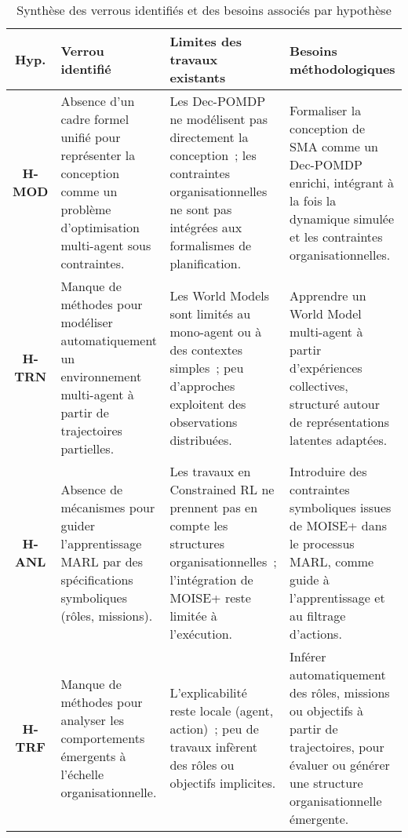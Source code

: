 \begin{table}[ht]
  \centering
  \caption{Synthèse des verrous identifiés et des besoins associés par hypothèse}
  \label{tab:verrous_hypotheses}
  \renewcommand{\arraystretch}{1.3}
  \begin{tabularx}{\textwidth}{cXXX}
    \hline
    \textbf{Hyp.}  & \textbf{Verrou identifié}                                                                                                      & \textbf{Limites des travaux existants}                                                                                                                 & \textbf{Besoins méthodologiques}                                                                                                                      \\
    \hline
    \textbf{H-MOD} & Absence d'un cadre formel unifié pour représenter la conception comme un problème d'optimisation multi-agent sous contraintes. & Les Dec-POMDP ne modélisent pas directement la conception~; les contraintes organisationnelles ne sont pas intégrées aux formalismes de planification. & Formaliser la conception de SMA comme un Dec-POMDP enrichi, intégrant à la fois la dynamique simulée et les contraintes organisationnelles.           \\

    \textbf{H-TRN} & Manque de méthodes pour modéliser automatiquement un environnement multi-agent à partir de trajectoires partielles.            & Les World Models sont limités au mono-agent ou à des contextes simples~; peu d'approches exploitent des observations distribuées.                      & Apprendre un World Model multi-agent à partir d'expériences collectives, structuré autour de représentations latentes adaptées.                       \\

    \textbf{H-ANL} & Absence de mécanismes pour guider l'apprentissage MARL par des spécifications symboliques (rôles, missions).                   & Les travaux en Constrained RL ne prennent pas en compte les structures organisationnelles~; l'intégration de MOISE+ reste limitée à l'exécution.       & Introduire des contraintes symboliques issues de MOISE+ dans le processus MARL, comme guide à l'apprentissage et au filtrage d'actions.               \\

    \textbf{H-TRF} & Manque de méthodes pour analyser les comportements émergents à l'échelle organisationnelle.                                    & L'explicabilité reste locale (agent, action)~; peu de travaux infèrent des rôles ou objectifs implicites.                                              & Inférer automatiquement des rôles, missions ou objectifs à partir de trajectoires, pour évaluer ou générer une structure organisationnelle émergente. \\
    \hline
  \end{tabularx}
\end{table}
